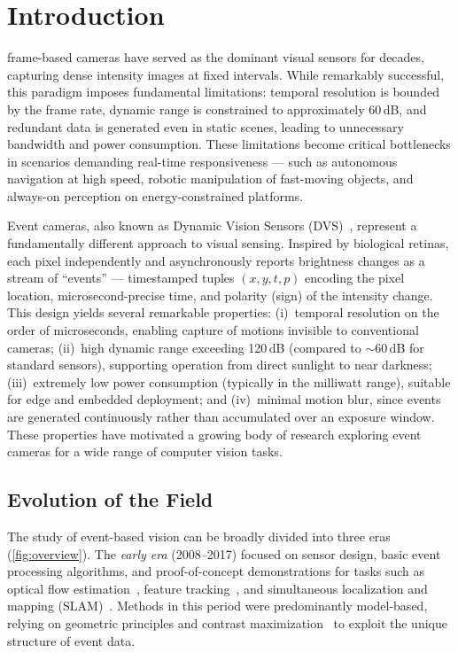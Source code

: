 \section{Introduction}
\label{sec:intro}


 frame-based cameras have served as the dominant visual sensors for decades, capturing dense intensity images at fixed intervals. While remarkably successful, this paradigm imposes fundamental limitations: temporal resolution is bounded by the frame rate, dynamic range is constrained to approximately 60\,dB, and redundant data is generated even in static scenes, leading to unnecessary bandwidth and power consumption. These limitations become critical bottlenecks in scenarios demanding real-time responsiveness --- such as autonomous navigation at high speed, robotic manipulation of fast-moving objects, and always-on perception on energy-constrained platforms.

Event cameras, also known as Dynamic Vision Sensors (DVS)~\cite{lichtsteiner2008dvs}, represent a fundamentally different approach to visual sensing. Inspired by biological retinas, each pixel independently and asynchronously reports brightness changes as a stream of ``events'' --- timestamped tuples $(x, y, t, p)$ encoding the pixel location, microsecond-precise time, and polarity (sign) of the intensity change. This design yields several remarkable properties: (i)~temporal resolution on the order of microseconds, enabling capture of motions invisible to conventional cameras; (ii)~high dynamic range exceeding 120\,dB (compared to $\sim$60\,dB for standard sensors), supporting operation from direct sunlight to near darkness; (iii)~extremely low power consumption (typically in the milliwatt range), suitable for edge and embedded deployment; and (iv)~minimal motion blur, since events are generated continuously rather than accumulated over an exposure window. These properties have motivated a growing body of research exploring event cameras for a wide range of computer vision tasks.


\subsection{Evolution of the Field}
\label{sec:intro_evolution}

The study of event-based vision can be broadly divided into three eras (\cref{fig:overview}). The \textit{early era} (2008--2017) focused on sensor design, basic event processing algorithms, and proof-of-concept demonstrations for tasks such as optical flow estimation~\cite{benosman2014opticalflow}, feature tracking~\cite{kueng2016feature}, and simultaneous localization and mapping (SLAM)~\cite{kim2016slam}. Methods in this period were predominantly model-based, relying on geometric principles and contrast maximization~\cite{gallego2018cmax} to exploit the unique structure of event data.

